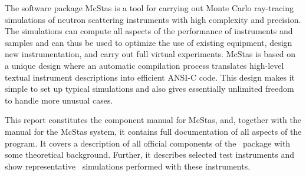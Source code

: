 The software package McStas is a tool for carrying out Monte Carlo
ray-tracing simulations of neutron scattering instruments with high
complexity and precision. The simulations can compute all aspects of the
performance of instruments and samples 
and can thus be used to optimize the use of existing equipment, 
design new instrumentation, and carry out full virtual experiments. 
McStas is based on a unique design where an automatic compilation process
translates high-level textual instrument descriptions into efficient
ANSI-C code. This design makes it simple to set up typical simulations
and also gives essentially unlimited freedom to handle more unusual
cases.

This report constitutes the component manual for McStas, and,
together with the manual for the McStas system, it
contains full documentation of all aspects of the program. It covers
a description of all official components of the \MCS\ package with
some theoretical background. Further, it describes selected test
instruments and show representative \MCS\ simulations performed with these
instruments.

